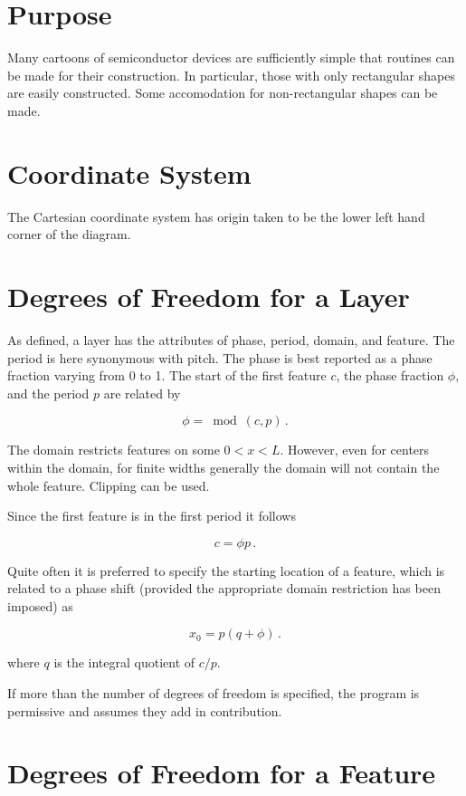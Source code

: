 \documentclass{article}
\begin{document}
\section{Purpose}
Many cartoons of semiconductor devices are sufficiently simple that routines can be made for their construction. In particular, those with only rectangular shapes are easily constructed. Some accomodation for non-rectangular shapes can be made.


\section{Coordinate System}
The Cartesian coordinate system has origin taken to be the lower left hand corner of the diagram.

\section{Degrees of Freedom for a Layer}

As defined, a layer has the attributes of phase, period, domain, and feature. The period is here synonymous with pitch. The phase is best reported as a phase fraction varying from 0 to 1. The start of the first feature $c$, the phase fraction $\phi$, and the period $p$ are related by

$$ \phi = \bmod(c, p) \,.$$

The domain restricts features on some $0 < x < L$. However, even for centers within the domain, for finite widths generally the domain will not contain the whole feature. Clipping can be used.

Since the first feature is in the first period it follows

$$c = \phi p \,. $$

Quite often it is preferred to specify the starting location of a feature, which is related to a phase shift (provided the appropriate domain restriction has been imposed) as

$$ x_0 = p (q + \phi) \,. $$

where $q$ is the integral quotient of $c/p$.

If more than the number of degrees of freedom is specified, the program is permissive and assumes they add in contribution.

\section{Degrees of Freedom for a Feature}
\end{document}
